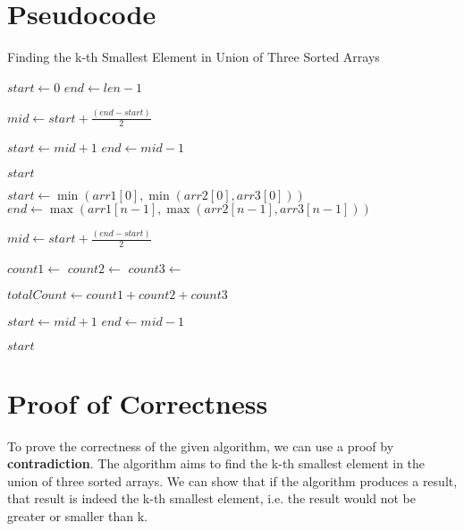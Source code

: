 \documentclass[8pt]{article}
\begin{document}
\section{Pseudocode}
\begin{algorithm}
\caption{Finding the k-th Smallest Element in Union of Three Sorted Arrays}
\begin{algorithmic}[1]

    \State $start \gets 0$
    \State $end \gets len - 1$
    
        \State $mid \gets start + \frac{(end - start)}{2}$
        
            \State $start \gets mid + 1$
        \Else
            \State $end \gets mid - 1$
        \EndIf
    \EndWhile
    
    \State \Return $start$
\EndFunction

    \State $start \gets \min(arr1[0], \min(arr2[0], arr3[0]))$
    \State $end \gets \max(arr1[n-1], \max(arr2[n-1], arr3[n-1]))$
    
        \State $mid \gets start + \frac{(end - start)}{2}$
        
        \State $count1 \gets$ 
        \State $count2 \gets$ 
        \State $count3 \gets$ 
        
        \State $totalCount \gets count1 + count2 + count3$
        
            \State $start \gets mid + 1$
        \Else
            \State $end \gets mid - 1$
        \EndIf
    \EndWhile
    
    \State \Return $start$
\EndFunction

\end{algorithmic}
\end{algorithm}


\section{Proof of Correctness}


To prove the correctness of the given algorithm, we can use a proof by \textbf{contradiction}. The algorithm aims to find the k-th smallest element in the union of three sorted arrays. We can show that if the algorithm produces a result, that result is indeed the k-th smallest element, i.e. the result would not be greater or smaller than k.
\end{document}
